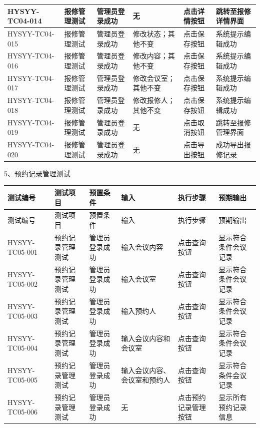 \documentclass{izdthesis}
\begin{document}
{\begin{longtable}{|p{2.3cm}|p{1.8cm}|p{1.9cm}|p{3.2cm}|p{2.1cm}|p{2.3cm}|}
  \hline
  HYSYY-TC04-014 & 报修管理测试 & 管理员登录成功 & 无 & 点击详情按钮 & 跳转至报修详情界面 \\
  \hline
  HYSYY-TC04-015 & 报修管理测试 & 管理员登录成功 & 修改状态；其他不变 & 点击保存按钮 & 系统提示编辑成功 \\
  \hline
  HYSYY-TC04-016 & 报修管理测试 & 管理员登录成功 & 修改内容；其他不变 & 点击保存按钮 & 系统提示编辑成功 \\
  \hline
  HYSYY-TC04-017 & 报修管理测试 & 管理员登录成功 & 修改会议室；其他不变 & 点击保存按钮 & 系统提示编辑成功 \\
  \hline
  HYSYY-TC04-018 & 报修管理测试 & 管理员登录成功 & 修改报修人；其他不变 & 点击保存按钮 & 系统提示编辑成功 \\
  \hline
  HYSYY-TC04-019 & 报修管理测试 & 管理员登录成功 & 无 & 点击取消按钮 & 跳转至报修管理界面 \\
  \hline
  HYSYY-TC04-020 & 报修管理测试 & 管理员登录成功 & 无 & 点击导出按钮 & 成功导出报修记录 \\
  \hline
\end{longtable}
}

5、预约记录管理测试

{\songti
\begin{longtable}{|p{2.3cm}|p{1.8cm}|p{1.9cm}|p{3.2cm}|p{2.1cm}|p{2.3cm}|}
  \hline
  测试编号 & 测试项目 & 预置条件 & 输入 & 执行步骤 & 预期输出 \\
  \hline
  \endfirsthead
  \hline
  测试编号 & 测试项目 & 预置条件 & 输入 & 执行步骤 & 预期输出 \\
  \hline
  \endhead
  HYSYY-TC05-001 & 预约记录管理测试 & 管理员登录成功 & 输入会议内容 & 点击查询按钮 & 显示符合条件会议记录 \\
  \hline
  HYSYY-TC05-002 & 预约记录管理测试 & 管理员登录成功 & 输入会议室 & 点击查询按钮 & 显示符合条件会议记录 \\
  \hline
  HYSYY-TC05-003 & 预约记录管理测试 & 管理员登录成功 & 输入预约人 & 点击查询按钮 & 显示符合条件会议记录 \\
  \hline
  HYSYY-TC05-004 & 预约记录管理测试 & 管理员登录成功 & 输入会议内容和会议室 & 点击查询按钮 & 显示符合条件会议记录 \\
  \hline
  HYSYY-TC05-005 & 预约记录管理测试 & 管理员登录成功 & 输入会议内容、会议室和预约人 & 点击查询按钮 & 显示符合条件会议记录 \\
  \hline
  HYSYY-TC05-006 & 预约记录管理测试 & 管理员登录成功 & 无 & 点击预约记录管理按钮 & 显示所有预约记录信息 \\
  \hline
\end{longtable}
}
\end{document}
